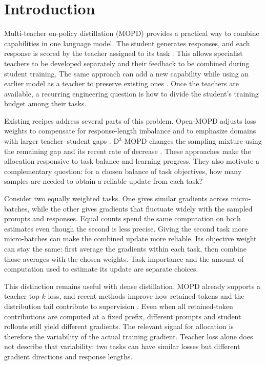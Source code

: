 \section{Introduction}
\label{sec:intro}

Multi-teacher on-policy distillation (MOPD) provides a practical way to
combine capabilities in one language model. The student generates responses,
and each response is scored by the teacher assigned to its task
\citep{ma2026mopdmultiteacheronpolicydistillation}. This allows specialist
teachers to be developed separately and their feedback to be combined during
student training. The same approach can add a new capability while using an
earlier model as a teacher to preserve existing ones
\citep{liu2026instella}. Once the teachers are available, a recurring
engineering question is how to divide the student's training budget among
their tasks.

Existing recipes address several parts of this problem. Open-MOPD adjusts
loss weights to compensate for response-length imbalance and to emphasize
domains with larger teacher--student gaps
\citep{gao2026openmopddiagnosingfixingcapability}. D$^3$-MOPD changes the
sampling mixture using the remaining gap and its recent rate of decrease
\citep{sun2026d3mopd}. These approaches make the allocation responsive to
task balance and learning progress. They also motivate a complementary
question: for a chosen balance of task objectives, how many samples are
needed to obtain a reliable update from each task?

Consider two equally weighted tasks. One gives similar gradients across
micro-batches, while the other gives gradients that fluctuate widely with
the sampled prompts and responses. Equal counts spend the same computation
on both estimates even though the second is less precise. Giving the second
task more micro-batches can make the combined update more reliable. Its
objective weight can stay the same: first average the gradients within each
task, then combine those averages with the chosen weights. Task importance
and the amount of computation used to estimate its update are separate
choices.

This distinction remains useful with dense distillation. MOPD already
supports a teacher top-$k$ loss, and recent methods improve how retained
tokens and the distribution tail contribute to supervision
\citep{ma2026mopdmultiteacheronpolicydistillation,huang2026tailaware}.
Even when all retained-token contributions are computed at a fixed prefix,
different prompts and student rollouts still yield different gradients.
The relevant signal for allocation is therefore the variability of the
actual training gradient. Teacher loss alone does not describe that
variability: two tasks can have similar losses but different gradient
directions and response lengths.

